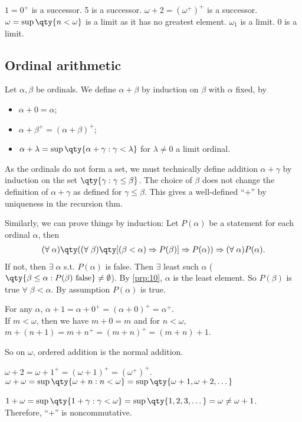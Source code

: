 \begin{example}
    $1 = 0^+$ is a successor.
    5 is a successor.
    $\omega + 2 = (\omega^+)^+$ is a successor.
    $\omega = \sup \qty{n < \omega}$ is a limit as it has no greatest element.
    $\omega_1$ is a limit.
    0 is a limit.
\end{example}

\subsection{Ordinal arithmetic}
Let $\alpha, \beta$ be ordinals.
We define $\alpha + \beta$ by induction on $\beta$ with $\alpha$ fixed, by
\begin{itemize}
    \item $\alpha + 0 = \alpha$;
    \item $\alpha + \beta^+ = (\alpha + \beta)^+$;
    \item $\alpha + \lambda = \sup\qty{\alpha + \gamma : \gamma < \lambda}$ for $\lambda \neq 0$ a limit ordinal.
\end{itemize}

\begin{remark}
    As the ordinals do not form a set, we must technically define addition $\alpha + \gamma$ by induction on the set $\qty{\gamma : \gamma \leq \beta}$.
    The choice of $\beta$ does not change the definition of $\alpha + \gamma$ as defined for $\gamma \leq \beta$.
    This gives a well-defined ``$+$'' by uniqueness in the recursion thm.

    Similarly, we can prove things by induction:
    Let $P(\alpha)$ be a statement for each ordinal $\alpha$, then
    \begin{align*}
        (\forall \; \alpha) \qty((\forall \; \beta) \qty[(\beta < \alpha) \implies P(\beta)] \implies P(\alpha)) \implies (\forall \; \alpha) P(\alpha).
    \end{align*}
    If not, then $\exists \; \alpha$ s.t. $P(\alpha)$ is false.
    Then $\exists$ least such $\alpha$ ($\qty{\beta \leq \alpha : P(\beta) \text{ false}} \neq \emptyset$).
    By \cref{prp:10}, $\alpha$ is the least element.
    So $P(\beta)$ is true $\forall \; \beta < \alpha$.
    By assumption $P(\alpha)$ is true.
\end{remark}

\begin{example}
    For any $\alpha$, $\alpha + 1 = \alpha + 0^+ = (\alpha + 0)^+ = \alpha^+$. \\
    If $m < \omega$, then we have $m + 0 = m$ and for $n < \omega$, $m + (n + 1) = m + n^+ = (m + n)^+ = (m+n) + 1$.

    So on $\omega$, ordered addition is the normal addition.

    $\omega + 2 = \omega + 1^+ = (\omega + 1)^+ = (\omega^+)^+$. \\
    $\omega + \omega = \sup \qty{\omega + n : n < \omega} = \sup\qty{\omega + 1, \omega + 2, \dots}$

    $1 + \omega = \sup\qty{1 + \gamma : \gamma < \omega} = \sup\qty{1, 2, 3, \dots} = \omega \neq \omega + 1$. \\
    Therefore, ``$+$'' is noncommutative.
\end{example}

